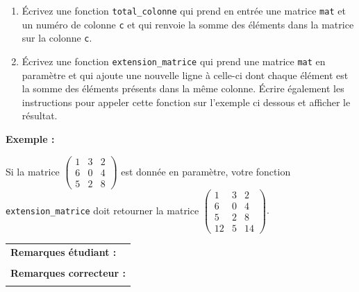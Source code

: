 \documentclass[a4paper,11pt]{article}
\begin{document}
\begin{enumerate}
\item \'Ecrivez une fonction \texttt{total\_colonne}  qui prend en entrée une matrice \texttt{mat}  et un numéro de colonne \texttt{c} et qui renvoie la somme des éléments dans la matrice sur la colonne \texttt{c}. 
\item Écrivez une fonction \texttt{extension\_matrice} qui prend une matrice \texttt{mat} en paramètre et qui ajoute une nouvelle ligne à celle-ci dont chaque élément est la somme des éléments présents dans la même colonne.
	Écrire également les instructions pour appeler cette fonction sur l'exemple ci dessous et afficher le résultat.
\end{enumerate}	
\vspace{0.5 cm}

\textbf{Exemple :}  
	
	
	\noindent Si la matrice
	\begin{math}
		\begin{pmatrix}
			1 & 3 & 2\\
			6 & 0 & 4\\
			5 & 2 & 8
		\end{pmatrix}
	\end{math}
	est donnée en paramètre, votre fonction \texttt{extension\_matrice} doit retourner la matrice
	\begin{math}
		\begin{pmatrix}
			1 & 3 & 2 \\
			6 & 0 & 4 \\
			5 & 2 & 8 \\
			12 & 5 & 14
		\end{pmatrix}.
	\end{math}



\vspace{1.5 cm}
\begin{table}[h!]
\centering
\renewcommand{\arraystretch}{1.4} %
\begin{tabular}{|p{15cm}|}
\hline
\textbf{Remarques étudiant :}    \\
 \\
\hline
\textbf{Remarques correcteur :}  \\
 \\
\hline
\end{tabular}
\end{table}


\newpage 

\newpage
\end{document}
